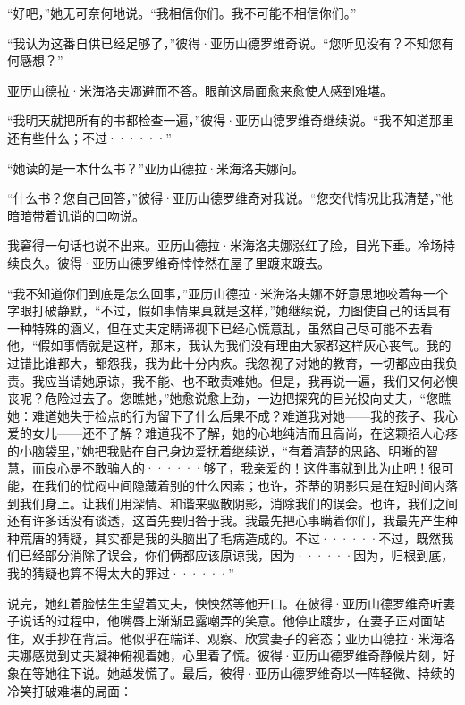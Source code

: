 \documentclass[12pt, UTF8]{ctexbook}
\begin{document}
\par “好吧，”她无可奈何地说。“我相信你们。我不可能不相信你们。”
\par “我认为这番自供已经足够了，”彼得·亚历山德罗维奇说。“您听见没有？不知您有何感想？”
\par 亚历山德拉·米海洛夫娜避而不答。眼前这局面愈来愈使人感到难堪。
\par “我明天就把所有的书都检查一遍，”彼得·亚历山德罗维奇继续说。“我不知道那里还有些什么；不过······”
\par “她读的是一本什么书？”亚历山德拉·米海洛夫娜问。
\par “什么书？您自己回答，”彼得·亚历山德罗维奇对我说。“您交代情况比我清楚，”他暗暗带着讥诮的口吻说。
\par 我窘得一句话也说不出来。亚历山德拉·米海洛夫娜涨红了脸，目光下垂。冷场持续良久。彼得·亚历山德罗维奇悻悻然在屋子里踱来踱去。
\par “我不知道你们到底是怎么回事，”亚历山德拉·米海洛夫娜不好意思地咬着每一个字眼打破静默，“不过，假如事情果真就是这样，”她继续说，力图使自己的话具有一种特殊的涵义，但在丈夫定睛谛视下已经心慌意乱，虽然自己尽可能不去看他，“假如事情就是这样，那末，我认为我们没有理由大家都这样灰心丧气。我的过错比谁都大，都怨我，我为此十分内疚。我忽视了对她的教育，一切都应由我负责。我应当请她原谅，我不能、也不敢责难她。但是，我再说一遍，我们又何必懊丧呢？危险过去了。您瞧她，”她愈说愈上劲，一边把探究的目光投向丈夫，“您瞧她：难道她失于检点的行为留下了什么后果不成？难道我对她——我的孩子、我心爱的女儿——还不了解？难道我不了解，她的心地纯洁而且高尚，在这颗招人心疼的小脑袋里，”她把我贴在自己身边爱抚着继续说，“有着清楚的思路、明晰的智慧，而良心是不敢骗人的······够了，我亲爱的！这件事就到此为止吧！很可能，在我们的忧闷中间隐藏着别的什么因素；也许，芥蒂的阴影只是在短时间内落到我们身上。让我们用深情、和谐来驱散阴影，消除我们的误会。也许，我们之间还有许多话没有谈透，这首先要归咎于我。我最先把心事瞒着你们，我最先产生种种荒唐的猜疑，其实都是我的头脑出了毛病造成的。不过······不过，既然我们已经部分消除了误会，你们俩都应该原谅我，因为······因为，归根到底，我的猜疑也算不得太大的罪过······”
\par 说完，她红着脸怯生生望着丈夫，怏怏然等他开口。在彼得·亚历山德罗维奇听妻子说话的过程中，他嘴唇上渐渐显露嘲弄的笑意。他停止踱步，在妻子正对面站住，双手抄在背后。他似乎在端详、观察、欣赏妻子的窘态；亚历山德拉·米海洛夫娜感觉到丈夫凝神俯视着她，心里着了慌。彼得·亚历山德罗维奇静候片刻，好象在等她往下说。她越发慌了。最后，彼得·亚历山德罗维奇以一阵轻微、持续的冷笑打破难堪的局面：
\end{document}
